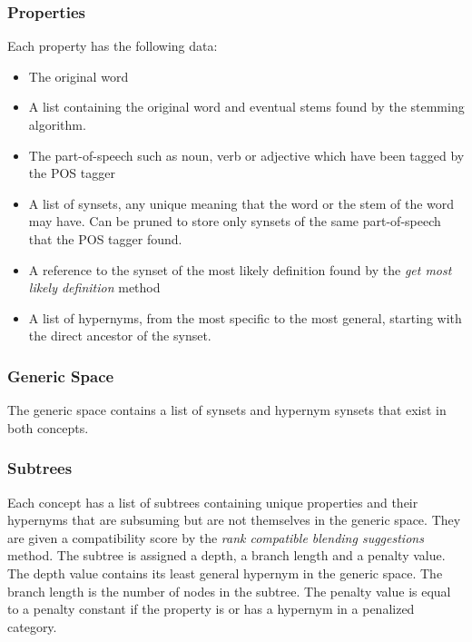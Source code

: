 \subsubsection{Properties}
Each property has the following data:
\begin{itemize}
\item The original word
\item A list containing the original word and eventual stems found by the stemming algorithm.
\item The part-of-speech such as noun, verb or adjective which have been tagged by the POS tagger
\item A list of synsets, any unique meaning that the word or the stem of the word may have. Can be pruned to store only synsets of the same part-of-speech that the POS tagger found.
\item A reference to the synset of the most likely definition found by the \emph{get most likely definition} method
\item A list of hypernyms, from the most specific to the most general, starting with the direct ancestor of the synset.
\end{itemize}

\subsubsection{Generic Space}
The generic space contains a list of synsets and hypernym synsets that exist in both concepts.

\subsubsection{Subtrees}
Each concept has a list of subtrees containing unique properties and their hypernyms that are subsuming but are not themselves in the generic space. They are given a compatibility score by the \emph{rank compatible blending suggestions} method. The subtree is assigned a depth, a branch length and a penalty value. The depth value contains its least general hypernym in the generic space.
The branch length is the number of nodes in the subtree. The penalty value is equal to a penalty constant if the property is or has a hypernym in a penalized category.

